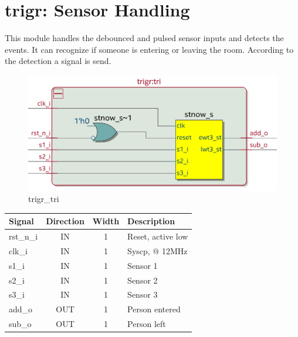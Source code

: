 \documentclass[12pt,a4 paper] {report}
\begin{document}
\newpage

\section{trigr: Sensor Handling}
This module handles the debounced and pulsed sensor inputs and detects the events. It can recognize if someone is entering 
or leaving the room. According to the detection a signal is send.
\begin{figure}[h]
	\centering	
	\includegraphics[scale=0.2]{../png/trigr_tri.png}
	\caption{trigr\_tri}
\end{figure}
\begin{center}
	\begin{tabular}{ | p{2cm} | c | c | p{5cm} |}
		\hline
		\textbf{Signal} & \textbf{Direction} & \textbf{Width} & \textbf{Description} \\
		\hline	
		rst\_n\_i & IN & 1 & Reset, active low \\
		\hline
		clk\_i & IN & 1 & Syscp, @ 12MHz \\
		\hline
		s1\_i & IN & 1 & Sensor 1 \\
		\hline
		s2\_i & IN & 1 & Sensor 2 \\
		\hline
		s3\_i & IN & 1 & Sensor 3 \\
		\hline
		add\_o & OUT & 1 & Person entered \\
		\hline
		sub\_o & OUT & 1 & Person left \\
		\hline
	\end{tabular}
\end{center}

\newpage
\end{document}
